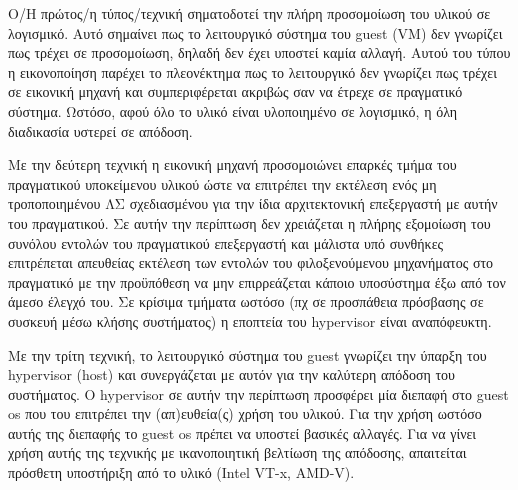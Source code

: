 Ο/Η πρώτος/η τύπος/τεχνική σηματοδοτεί την πλήρη προσομοίωση του υλικού σε
λογισμικό. Αυτό σημαίνει πως το λειτουργικό σύστημα του guest (VM) δεν γνωρίζει
πως τρέχει σε προσομοίωση, δηλαδή δεν έχει υποστεί καμία αλλαγή. Αυτού του τύπου
η εικονοποίηση παρέχει το πλεονέκτημα πως το λειτουργικό δεν γνωρίζει πως τρέχει
σε εικονική μηχανή και συμπεριφέρεται ακριβώς σαν να έτρεχε σε πραγματικό
σύστημα. Ωστόσο, αφού όλο το υλικό είναι υλοποιημένο σε λογισμικό, η όλη
διαδικασία υστερεί σε απόδοση.

Με την δεύτερη τεχνική η εικονική μηχανή προσομοιώνει επαρκές τμήμα του
πραγματικού υποκείμενου υλικού ώστε να επιτρέπει την εκτέλεση ενός μη
τροποποιημένου ΛΣ σχεδιασμένου για την ίδια αρχιτεκτονική επεξεργαστή με αυτήν
του πραγματικού. Σε αυτήν την περίπτωση δεν χρειάζεται η πλήρης εξομοίωση του
συνόλου εντολών του πραγματικού επεξεργαστή και μάλιστα υπό συνθήκες επιτρέπεται
απευθείας εκτέλεση των εντολών του φιλοξενούμενου μηχανήματος στο πραγματικό με
την προϋπόθεση να μην επιρρεάζεται κάποιο υποσύστημα έξω από τον άμεσο έλεγχό
του. Σε κρίσιμα τμήματα ωστόσο (πχ σε προσπάθεια πρόσβασης σε συσκευή μέσω κλήσης
συστήματος) η εποπτεία του hypervisor είναι αναπόφευκτη.

Με την τρίτη τεχνική, το λειτουργικό σύστημα του guest γνωρίζει την ύπαρξη του
hypervisor (host) και συνεργάζεται με αυτόν για την καλύτερη απόδοση του
συστήματος. Ο hypervisor σε αυτήν την περίπτωση προσφέρει μία διεπαφή στο guest
os που του επιτρέπει την (απ)ευθεία(ς) χρήση του υλικού. Για την χρήση ωστόσο
αυτής της διεπαφής το guest os πρέπει να υποστεί βασικές αλλαγές. Για να γίνει
χρήση αυτής της τεχνικής με ικανοποιητική βελτίωση της απόδοσης, απαιτείται
πρόσθετη υποστήριξη από το υλικό (Intel VT-x, AMD-V).

